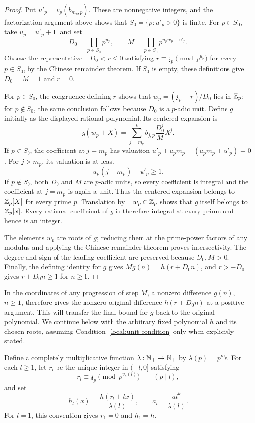 \begin{proof}
Put \(u'_p=v_p(b_{m_p,p})\). These are nonnegative integers, and the
factorization argument above shows that
\(S_0=\{p:u'_p>0\}\) is finite. For \(p\in S_0\), take
\(u_p=u'_p+1\), and set
\[
 D_0=\prod_{p\in S_0}p^{u_p},
 \qquad M=\prod_{p\in S_0}p^{u_pm_p+u'_p}.
\]
Choose the representative \(-D_0<r\le0\) satisfying
\(r\equiv\mathfrak z_p\pmod{p^{u_p}}\) for every \(p\in S_0\), by the
Chinese remainder theorem. If \(S_0\) is empty, these definitions give
\(D_0=M=1\) and \(r=0\).

For \(p\in S_0\), the congruence defining \(r\) shows that
\(w_p=(\mathfrak z_p-r)/D_0\) lies in \(\mathbb Z_p\); for \(p\notin S_0\), the
same conclusion follows because \(D_0\) is a \(p\)-adic unit. Define \(g\)
initially as the displayed rational polynomial. Its centered expansion is
\[
 g(w_p+X)=\sum_{j=m_p}^k b_{j,p}\frac{D_0^j}{M}X^j.
\]
If \(p\in S_0\), the coefficient at \(j=m_p\) has valuation
\(u'_p+u_pm_p-(u_pm_p+u'_p)=0\). For \(j>m_p\), its valuation is at least
\[
 u_p(j-m_p)-u'_p\ge1.
\]
If \(p\notin S_0\), both \(D_0\) and \(M\) are \(p\)-adic units, so every
coefficient is integral and the coefficient at \(j=m_p\) is again a unit.
Thus the centered expansion belongs to \(\mathbb Z_p[X]\) for every prime \(p\).
Translation by \(-w_p\in\mathbb Z_p\) shows that \(g\) itself belongs to
\(\mathbb Z_p[x]\). Every rational coefficient of \(g\) is therefore integral at
every prime and hence is an integer.

The elements \(w_p\) are roots of \(g\); reducing them at the prime-power
factors of any modulus and applying the Chinese remainder theorem proves
intersectivity. The degree and sign of the leading coefficient are preserved
because \(D_0,M>0\). Finally, the defining identity for \(g\) gives
\(Mg(n)=h(r+D_0n)\), and \(r>-D_0\) gives \(r+D_0n\ge1\) for \(n\ge1\).
\end{proof}

In the coordinates of any progression of step \(M\), a nonzero difference
\(g(n)\), \(n\ge1\), therefore gives the nonzero original difference
\(h(r+D_0n)\) at a positive argument. This will transfer the final bound for
\(g\) back to the original polynomial. We continue below with the arbitrary
fixed polynomial \(h\) and its chosen roots, assuming
Condition~\eqref{local:unit-condition} only when explicitly stated.

Define a completely multiplicative function \(\lambda:\mathbb N_+\to\mathbb N_+\) by
\(\lambda(p)=p^{m_p}\). For each \(l\ge1\), let \(r_l\) be the unique
integer in \((-l,0]\) satisfying
\[
 r_l\equiv\mathfrak z_p\pmod{p^{v_p(l)}}
 \qquad(p\mid l),
\]
and set
\[
 h_l(x)=\frac{h(r_l+lx)}{\lambda(l)},
 \qquad a_l=\frac{a l^k}{\lambda(l)}.
\]
For \(l=1\), this convention gives \(r_1=0\) and \(h_1=h\).

